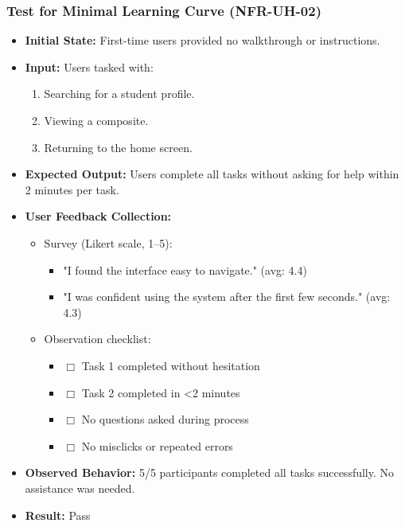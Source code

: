 \documentclass[12pt, titlepage]{article}
\begin{document}
\subsubsection{Test for Minimal Learning Curve (NFR-UH-02)}
\begin{itemize}
    \item \textbf{Initial State:} First-time users provided no walkthrough or instructions.
    \item \textbf{Input:} Users tasked with:
        \begin{enumerate}
            \item Searching for a student profile.
            \item Viewing a composite.
            \item Returning to the home screen.
        \end{enumerate}
    \item \textbf{Expected Output:} Users complete all tasks without asking for help within 2 minutes per task.
    \item \textbf{User Feedback Collection:}
        \begin{itemize}
            \item Survey (Likert scale, 1--5):
            \begin{itemize}
                \item "I found the interface easy to navigate." (avg: 4.4)
                \item "I was confident using the system after the first few seconds." (avg: 4.3)
            \end{itemize}
            \item Observation checklist:
            \begin{itemize}
                \item $\Box$ Task 1 completed without hesitation
                \item $\Box$ Task 2 completed in <2 minutes
                \item $\Box$ No questions asked during process
                \item $\Box$ No misclicks or repeated errors
            \end{itemize}
        \end{itemize}
    \item \textbf{Observed Behavior:} 5/5 participants completed all tasks successfully. No assistance was needed.
    \item \textbf{Result:} Pass
\end{itemize}
\end{document}
